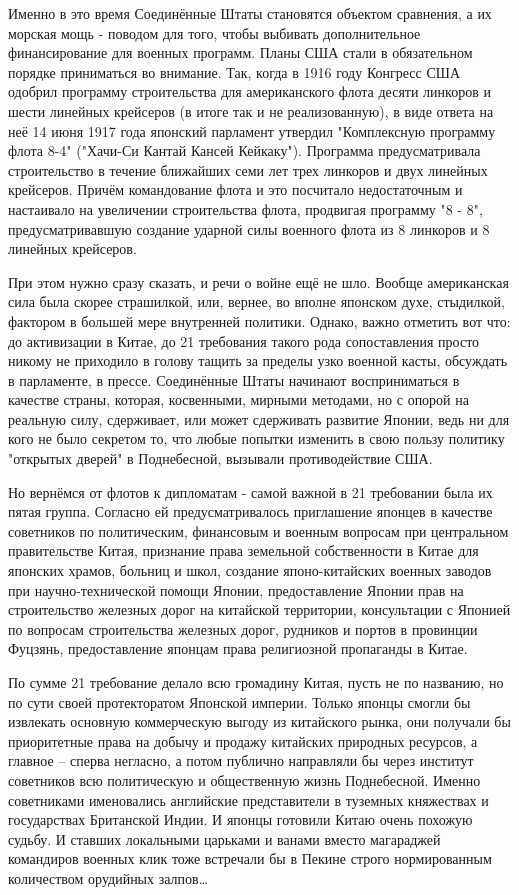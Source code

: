 Именно в это время Соединённые Штаты становятся объектом сравнения, а их морская мощь - поводом для того, чтобы выбивать дополнительное финансирование для военных программ. Планы США стали в обязательном порядке приниматься во внимание. Так, когда в 1916 году Конгресс США одобрил программу строительства для американского флота десяти линкоров и шести линейных крейсеров (в итоге так и не реализованную), в виде ответа на неё 14 июня 1917 года японский парламент утвердил "Комплексную программу флота 8-4" ("Хачи-Си Кантай Кансей Кейкаку"). Программа предусматривала строительство в течение ближайших семи лет трех линкоров и двух линейных крейсеров. Причём командование флота и это посчитало недостаточным и настаивало на увеличении строительства флота, продвигая программу "8 - 8", предусматривавшую создание ударной силы военного флота из 8 линкоров и 8 линейных крейсеров.

При этом нужно сразу сказать, и речи о войне ещё не шло. Вообще американская сила была скорее страшилкой, или, вернее, во вполне японском духе, стыдилкой, фактором в большей мере внутренней политики. Однако, важно отметить вот что: до активизации в Китае, до 21 требования такого рода сопоставления просто никому не приходило в голову тащить за пределы узко военной касты, обсуждать в парламенте, в прессе. Соединённые Штаты начинают восприниматься в качестве страны, которая, косвенными, мирными методами, но с опорой на реальную силу, сдерживает, или может сдерживать развитие Японии, ведь ни для кого не было секретом то, что любые попытки изменить в свою пользу политику "открытых дверей" в Поднебесной, вызывали противодействие США.

Но вернёмся от флотов к дипломатам - самой важной в 21 требовании была их пятая группа. Согласно ей предусматривалось приглашение японцев в качестве советников по политическим, финансовым и военным вопросам при центральном правительстве Китая, признание права земельной собственности в Китае для японских храмов, больниц и школ, создание японо-китайских военных заводов при научно-технической помощи Японии, предоставление Японии прав на строительство железных дорог на китайской территории, консультации с Японией по вопросам строительства железных дорог, рудников и портов в провинции Фуцзянь, предоставление японцам права религиозной пропаганды в Китае.

По сумме 21 требование делало всю громадину Китая, пусть не по названию, но по сути своей протекторатом Японской империи. Только японцы смогли бы извлекать основную коммерческую выгоду из китайского рынка, они получали бы приоритетные права на добычу и продажу китайских природных ресурсов, а главное – сперва негласно, а потом публично направляли бы через институт советников всю политическую и общественную жизнь Поднебесной. Именно советниками именовались английские представители в туземных княжествах и государствах Британской Индии. И японцы готовили Китаю очень похожую судьбу. И ставших локальными царьками и ванами вместо магараджей командиров военных клик тоже встречали бы в Пекине строго нормированным количеством орудийных залпов…

